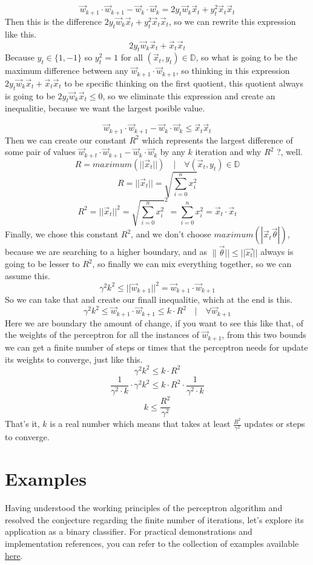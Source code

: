\[
  \vec{w}_{k + 1} \cdot \vec{w}_{k + 1} - \vec{w}_k \cdot \vec{w}_k
  = 2y_t\vec{w}_k\vec{x}_t + y_t^2\vec{x}_t\vec{x}_t
\]
Then this is the difference $2y_t\vec{w}_k\vec{x}_t + y_t^2\vec{x}_t\vec{x}_t$,
so we can rewrite this expression
like this.
\[
  2y_t\vec{w}_k\vec{x}_t + \vec{x}_t\vec{x}_t
\]
Because $y_t \in \{1, -1\}$ so $y_t^2 = 1$ for all $(\vec{x}_t, y_t) \in \mathbb{D}$, so what is going
to be the maximum difference between any $\vec{w}_{k+1} \cdot \vec{w}_{k+1}$, so thinking in this
expression $2y_t\vec{w}_k\vec{x}_t + \vec{x}_t\vec{x}_t$ to be specific thinking on the first quotient,
this quotient always is going to be $2y_t\vec{w}_k\vec{x}_t \le 0$, so we eliminate this
expression and create an inequalitie, because we want the largest posible value.

\[
  \vec{w}_{k + 1} \cdot \vec{w}_{k + 1} - \vec{w}_k \cdot \vec{w}_k
  \le \vec{x}_t\vec{x}_t
\]
Then we can create our constant $R^2$
 which represents the largest
difference of some pair of values $\vec{w}_{k+t} \cdot \vec{w}_{k+1} - \vec{w}_{k} \cdot \vec{w}_k$
by any $k$ iteration and why $R^2$ ?, well.
\[
  R = maximum(||\vec{x}_t||) \quad|\quad \forall (\vec{x}_t, y_t) \in \mathbb{D}
\]
\[
  R = ||\vec{x}_t|| = \sqrt{\sum_{i = 0}^{n}x_i^2}
\]
\[
  R^2 = ||\vec{x}_t||^2 = \sqrt{\sum_{i = 0}^{n}x_i^2}^2 = \sum_{i = 0}^{n}x_i^2 = \vec{x}_t \cdot \vec{x}_t
\]
Finally, we chose this constant $R^2$, and we don't choose $maximum(|\vec{x}_t\vec{\theta}|)$,
because we are searching to a higher boundary, and as $\|\vec{\theta}|| \le ||\vec{x_t}||$ always
is going to be lesser to $R^2$, so finally we can mix everything together, so we can assume this.
\[
  \gamma^2k^2 \le ||\vec{w}_{k+1}||^2 = \vec{w}_{k+1} \cdot \vec{w}_{k+1}
\]
So we can take that and create our finall inequalitie, which at the end is this.
\[
  \gamma^2k^2 \le \vec{w}_{k+1} \cdot \vec{w}_{k+1} \le k \cdot R^2\quad |\quad \forall\vec{w}_{k+1}
\]
Here we are boundary the amount of change, if you want to see this like
that, of the weights of the perceptron
for all the instances of $\vec{w}_{k + 1}$, from this two bounds we can get a finite number
of steps or times that the perceptron needs for update its weights to converge, just like this.
\[
  \gamma^2k^2 \le k \cdot R^2
\]
\[
  \frac{1}{\gamma^2 \cdot k} \cdot \gamma^2k^2 \le k \cdot R^2 \cdot \frac{1}{\gamma^2 \cdot k}
\]
\[
  k \le \frac{R^2}{\gamma^2}
\]
That's it, $k$ is a real number which means that takes at least $\frac{R^2}{\gamma^2}$
updates or steps to converge.

\section{Examples}
Having understood the working principles of the perceptron algorithm and resolved the conjecture regarding
the finite number of iterations, let's explore its application as a binary classifier. For practical
demonstrations and implementation references, you can refer to the collection of examples available
\href{https://github.com/alecksandr26/fortran-ml/tree/main/examples}{here}.

